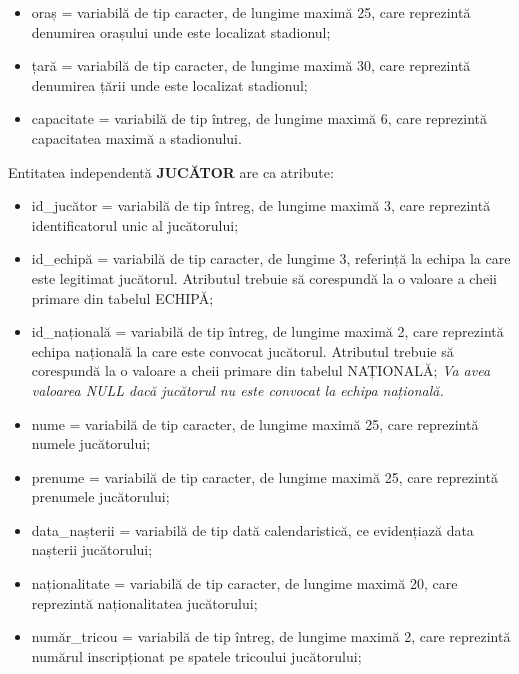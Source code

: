 \documentclass{article}
\begin{document}
\begin{spacing}{1.1}
\begin{itemize}
		\item oraș = variabilă de tip caracter, de lungime maximă 25, care reprezintă denumirea orașului unde este localizat stadionul;
		
		\item țară = variabilă de tip caracter, de lungime maximă 30, care reprezintă denumirea țării unde este localizat stadionul;
		
		\item capacitate = variabilă de tip întreg, de lungime maximă 6, care reprezintă capacitatea maximă a stadionului.
	\end{itemize}
	
	\vspace{0.3cm}
	
	Entitatea independentă \textbf{JUCĂTOR} are ca atribute:
	
	\begin{itemize}
		\item id\_jucător = variabilă de tip întreg, de lungime maximă 3, care reprezintă identificatorul unic al jucătorului;
		
		\item id\_echipă = variabilă de tip caracter, de lungime 3, referință la echipa la care este legitimat jucătorul. Atributul trebuie să corespundă la o valoare a cheii primare din tabelul ECHIPĂ;
		
		\item id\_națională = variabilă de tip întreg, de lungime maximă 2, care reprezintă echipa națională la care este convocat jucătorul. Atributul trebuie să corespundă la o valoare a cheii primare din tabelul NAȚIONALĂ; \textit{Va avea valoarea NULL dacă jucătorul nu este convocat la echipa națională.}
		 
		\item nume = variabilă de tip caracter, de lungime maximă 25, care reprezintă numele jucătorului;
		
		\item prenume = variabilă de tip caracter, de lungime maximă 25, care reprezintă prenumele jucătorului;
		
		\item data\_nașterii = variabilă de tip dată calendaristică, ce evidențiază data nașterii jucătorului;
		
		\item naționalitate = variabilă de tip caracter, de lungime maximă 20, care reprezintă naționalitatea jucătorului;
		
		\item număr\_tricou = variabilă de tip întreg, de lungime maximă 2, care reprezintă numărul inscripționat pe spatele tricoului jucătorului;
		

\end{itemize}
\end{spacing}
\end{document}
